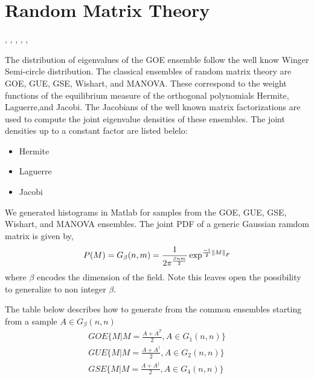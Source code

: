 \chapter{Random Matrix Theory}
\cite{RMTAchlioptas04randommatrices}, \cite{RMTAlon00bipartitesubgraphs}, \cite{RMTAlon00onthe} ,
\cite{RMTCooper00onthe}, \cite{RMTSoshnikov02anote}, \cite{RMTTracy98correlationfunctions}

The distribution of eigenvalues of the GOE ensemble follow the
well know Winger Semi-circle distribution.  The classical
ensembles of random matrix theory are GOE, GUE, GSE, Wishart, and MANOVA. These correspond to the weight functions of the equilibrium measure of the orthogonal polynomials Hermite, Laguerre,and Jacobi.  The Jacobians of the well known matrix factorizations are used to compute the joint eigenvalue densities of these ensembles. The joint densities up to a constant factor are listed belelo:
\begin{itemize}
  \item Hermite  \item Laguerre   \item Jacobi
\end{itemize}
We generated histograms in Matlab for samples from the GOE, GUE, GSE, Wishart, and MANOVA ensembles.
The joint PDF of a generic Gaussian ramdom matrix is given by,
\begin{equation*}
P(M)=G_\beta(n,m)=\frac{1}{2 \pi^{\frac{\beta n m}{2} }} \exp^{\frac{-1}{2}\left\Vert M\right\Vert_F }
\end{equation*} where $\beta$ encodes the dimension of the field.  Note this leaves open the possibility to
generalize to non integer $\beta$.

The table below describes how to generate from the common ensembles starting from a sample $A \in G_\beta(n,n)$
\begin{eqnarray*}
    GOE  \{ M | M = \frac{A+A^T}{2}, A \in G_1(n,n)\}\\ %
    GUE  \{ M | M = \frac{A+A^\dagger}{2}, A \in G_2(n,n)\}\\ %
    GSE  \{ M | M = \frac{A+A^\ddagger}{2}, A \in G_4(n,n)\} %
\end{eqnarray*}


